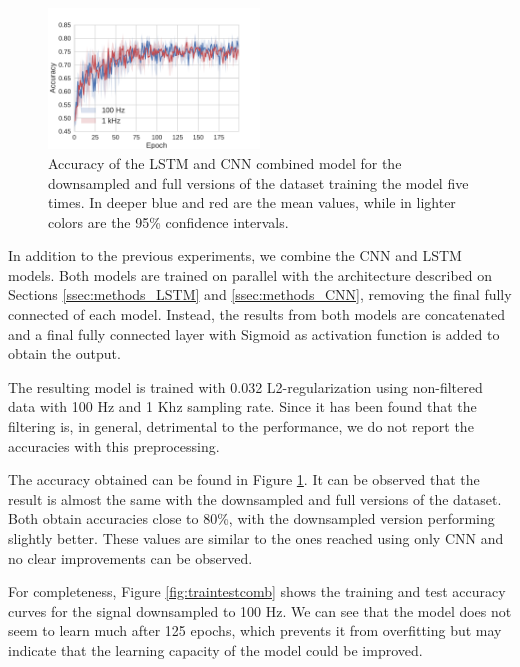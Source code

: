 \documentclass[10pt,conference,compsocconf]{IEEEtran}
\begin{document}
        \begin{figure}[t]
            \centering
            \includegraphics[width=0.5\textwidth]{figures/lstm_cnn_50.pdf}
            \caption{Accuracy of the LSTM and CNN combined model for the downsampled and full versions of the dataset training the model five times. In deeper blue and red are the mean values, while in lighter colors are the 95\% confidence intervals.}
            \label{fig:cnn_lstm_50}
        \end{figure}
    In addition to the previous experiments, we combine the CNN and LSTM models. Both models are trained on parallel with the architecture described on Sections \ref{ssec:methods_LSTM} and \ref{ssec:methods_CNN}, removing the final fully connected of each model. Instead, the results from both models are concatenated and a final fully connected layer with Sigmoid as activation function is added to obtain the output. 
    
    The resulting model is trained with 0.032 L2-regularization using non-filtered data with 100 Hz and 1 Khz sampling rate. Since it has been found that the filtering is, in general, detrimental to the performance, we do not report the accuracies with this preprocessing.
    
    The accuracy obtained can be found in Figure \ref{fig:cnn_lstm_50}. It can be observed that the result is almost the same with the downsampled and full versions of the dataset. Both obtain accuracies close to 80\%, with the downsampled version performing slightly better. These values are similar to the ones reached using only CNN and no clear improvements can be observed.
    
    For completeness, Figure \ref{fig:traintestcomb} shows the training and test accuracy curves for the signal downsampled to 100 Hz. We can see that the model does not seem to learn much after 125 epochs, which prevents it from overfitting but may indicate that the learning capacity of the model could be improved.
    
\end{document}
